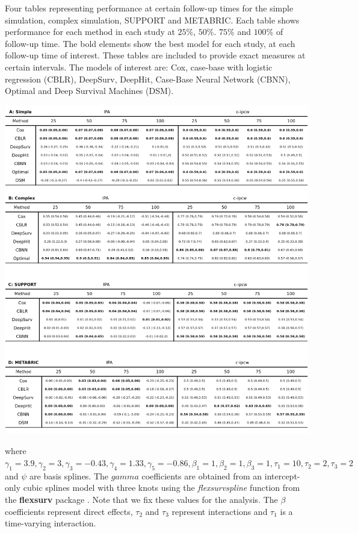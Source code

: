 \documentclass[AMA,STIX1COL,]{WileyNJD-v2}
\begin{document}
\FloatBarrier
\begin{table}
\caption{Four tables representing performance at certain follow-up times for the simple simulation, complex simulation, SUPPORT and METABRIC. Each table shows performance for each method in each study at $25\%$, $50\%$. $75\%$ and $100\%$ of follow-up time. The bold elements show the best model for each study, at each follow-up time of interest. These tables are included to provide exact measures at certain intervals. The models of interest are: Cox, case-base with logistic regression (CBLR), DeepSurv, DeepHit, Case-Base Neural Network (CBNN), Optimal and Deep Survival Machines (DSM).}
\label{tab:megaTable}

\begin{center}\includegraphics[width=1\linewidth]{../analyses/figures/megaTable} \end{center}

\end{table}
\FloatBarrier

where
\(\gamma_{1}=3.9, \gamma_{2}=3, \gamma_{3}=-0.43, \gamma_{4}=1.33,\gamma_{5}=-0.86, \beta_{{1}}=1, \beta_{{2}}=1, \beta_{{3}}=1, \tau_{1}=10, \tau_{2}=2, \tau_{3}=2\)
and \(\psi\) are basis splines. The \(gamma\) coefficients are obtained
from an intercept-only cubic splines model with three knots using the
\emph{flexsurvspline} function from the \textbf{flexsurv} package
\citep{flexsurv}. Note that we fix these values for the analysis. The
\(\beta\) coefficients represent direct effects, \(\tau_{2}\) and
\({\tau_3}\) represent interactions and \(\tau_{1}\) is a time-varying
interaction.
\end{document}
